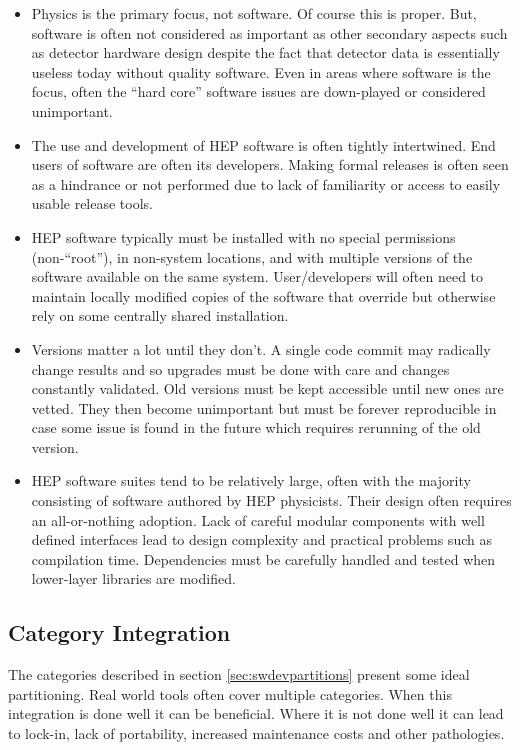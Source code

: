 \begin{itemize}
\item Physics is the primary focus, not software.  Of course this is
  proper.  But, software is often not considered as important as other
  secondary aspects such as detector hardware design despite the fact
  that detector data is essentially useless today without quality software.  Even
  in areas where software is the focus, often the ``hard core''
  software issues are down-played or considered unimportant.
\item The use and development of HEP software is often tightly
  intertwined.  End users of software are often its developers.
  Making formal releases is often seen as a hindrance or not 
  performed due to lack of familiarity or access to easily usable
  release tools.
\item HEP software typically must be installed with no special
  permissions (non-``root''), in non-system locations, and with
  multiple versions of the software available on the same system.
  User/developers will often need to maintain locally modified copies
  of the software that override but otherwise rely on some centrally
  shared installation.
\item Versions matter a lot until they don't.  A single code commit
  may radically change results and so upgrades must be done with care
  and changes constantly validated.  Old versions must be kept accessible
  until new ones are vetted.  They then become unimportant but must be
  forever reproducible in case some issue is found in the future which
  requires rerunning of the old version.
\item HEP software suites tend to be relatively large, often with the
  majority consisting of software authored by HEP physicists.  Their
  design often requires an all-or-nothing adoption.  Lack of careful
  modular components with well defined interfaces lead to design
  complexity and practical problems such as compilation time.
  Dependencies must be carefully handled and tested when lower-layer
  libraries are modified.
\end{itemize}



\subsection{Category Integration}

The categories described in section \ref{sec:swdevpartitions} present
some ideal partitioning.  Real world tools often cover multiple
categories.  When this integration is done well it can be beneficial.
Where it is not done well it can lead to lock-in, lack of portability,
increased maintenance costs and other pathologies.

